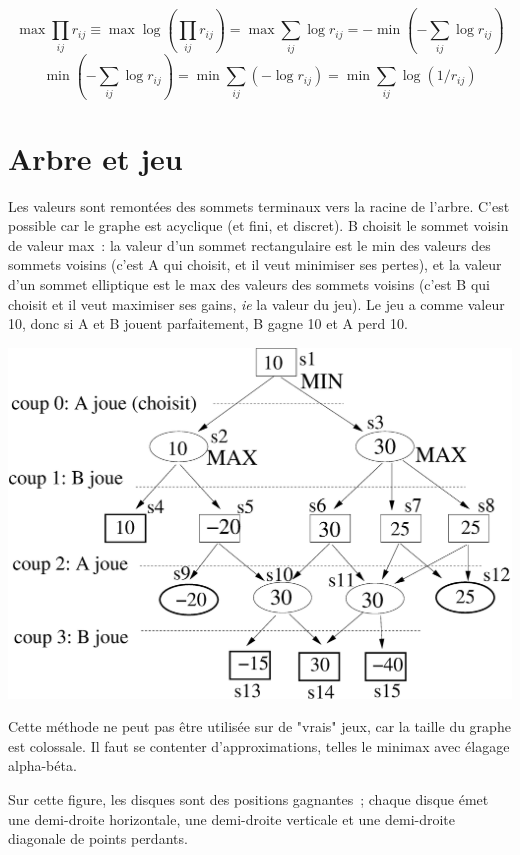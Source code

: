 \documentclass[11pt]{article}
\def\ie{{\it ie} }
\begin{document}
 $$ \max \prod_{ij} r_{ij} \equiv \max \log (\prod_{ij} r_{ij}) =\max \sum_{ij} \log r_{ij} = - \min( -\sum_{ij}\log r_{ij}) $$
$$\min( -\sum_{ij} \log r_{ij}) = \min \sum_{ij}(-\log r_{ij})=\min \sum_{ij} \log(1/r_{ij})$$


\section{Arbre et jeu}
Les valeurs sont remontées des sommets terminaux vers la racine de l'arbre.
C'est possible car le graphe est acyclique (et fini, et discret).
B choisit le sommet voisin de valeur max~: la valeur d'un sommet rectangulaire
est le min des valeurs des sommets voisins (c'est A qui choisit, et il 
veut minimiser ses pertes), et la valeur d'un sommet elliptique est le max des valeurs des sommets voisins (c'est B qui choisit et il veut maximiser ses gains, \ie la valeur du jeu). 
Le jeu a comme valeur 10, donc si A et B jouent parfaitement, B gagne 10 et A perd 10. 

\begin{center}
\includegraphics[width=0.99\linewidth]{jeu_solution.eps}
\end{center}
Cette méthode ne peut pas être utilisée sur de "vrais" jeux, car la taille du graphe est colossale. Il faut se contenter d'approximations, telles le
minimax avec élagage alpha-béta. 

Sur cette figure, les disques sont des positions gagnantes~; chaque disque émet une demi-droite horizontale, une demi-droite verticale et une demi-droite diagonale de points perdants.
\end{document}
